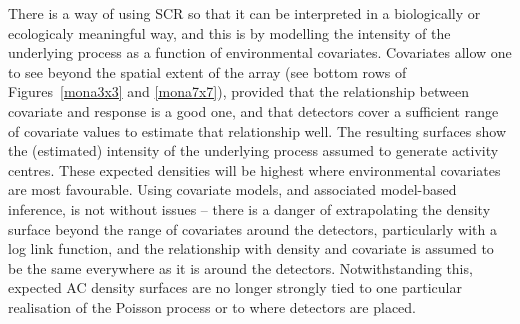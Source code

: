 \documentclass[useAMS,usenatbib,referee]{biom}
\begin{document}
There is a way of using SCR so that it can be interpreted in a biologically or ecologicaly meaningful way, and this is by modelling the intensity of the underlying process as a function of environmental covariates. Covariates allow one to see beyond the spatial extent of the array (see bottom rows of Figures~\ref{mona3x3} and \ref{mona7x7}), provided that the relationship between covariate and response is a good one, and that detectors cover a sufficient range of covariate values to estimate that relationship well. The resulting surfaces show the (estimated) intensity of the underlying process assumed to generate activity centres. These expected densities will be highest where environmental covariates are most favourable. Using covariate models, and associated model-based inference, is not without issues -- there is a danger of extrapolating the density surface beyond the range of covariates around the detectors, particularly with a log link function, and the relationship with density and covariate is assumed to be the same everywhere as it is around the detectors. Notwithstanding this, expected AC density surfaces are no longer strongly tied to one particular realisation of the Poisson process or to where detectors are placed.


\end{document}

